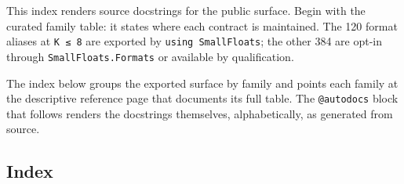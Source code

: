 \label{6573914004107900379}{}


This index renders source docstrings for the public surface. Begin with the curated family table: it states where each contract is maintained. The 120 format aliases at \texttt{K ≤ 8} are exported by \texttt{using SmallFloats}; the other 384 are opt-in through \texttt{SmallFloats.Formats} or available by qualification.



The index below groups the exported surface by family and points each family at the descriptive reference page that documents its full table. The \texttt{@autodocs} block that follows renders the docstrings themselves, alphabetically, as generated from source.



\subsection{Index}



\label{6663683553518785561}{}



